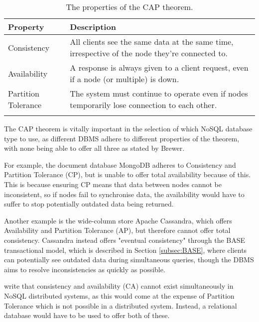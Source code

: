 \begin{longtable}{ | p{} | p{} | }
    \hline
    \cellcolor{blue!25}Property & \cellcolor{blue!25}Description\\
    \hline
    Consistency & All clients see the same data at the same time, irrespective of the node they're connected to.\\
    \hline
    Availability & A response is always given to a client request, even if a node (or multiple) is down.\\
    \hline
    Partition Tolerance & The system must continue to operate even if nodes temporarily lose connection to each other.\\
    \hline
    \caption{The properties of the CAP theorem. \autocite{brewerRobustDistributedSystems2000,ibmWhatCAPTheorem2022}}\label{tab:CAPTheorem}
\end{longtable}

\noindent The CAP theorem is vitally important in the selection of which NoSQL database type to use, as different DBMS adhere to different 
properties of the theorem, with none being able to offer all three as stated by Brewer. 

\para For example, the document database MongoDB adheres to Consistency and Partition Tolerance (CP), but is unable to 
offer total availability because of this. This is because ensuring CP means that data between nodes cannot be inconsistent, so if nodes fail to 
synchronise data, the availability would have to suffer to stop potentially outdated data being returned.

\para Another example is the wide-column store Apache Cassandra, which offers Availability and Partition Tolerance (AP), but 
therefore cannot offer total consistency. Cassandra instead offers "eventual consistency" through the BASE transactional model, which is 
described in Section \ref{subsec:BASE}, where clients can potentially see outdated data during simultaneous queries, though the DBMS aims 
to resolve inconsistencies as quickly as possible.

\para \textcite{ibmWhatCAPTheorem2022} write that consistency and availability (CA) cannot exist simultaneously in 
NoSQL distributed systems, as this would come at the expense of Partition Tolerance which is not possible in a distributed system. 
Instead, a relational database would have to be used to offer both of these.

